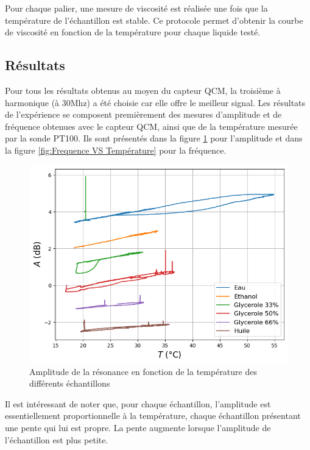 Pour chaque palier, une mesure de viscosité est réalisée une fois que la température de l'échantillon est stable. Ce protocole permet d'obtenir la courbe de viscosité en fonction de la température pour chaque liquide testé.
\newpage
\subsection{Résultats}

Pour tous les résultats obtenus au moyen du capteur QCM, la troisième à harmonique (à 30Mhz) a été choisie car elle offre le meilleur signal. Les résultats de l'expérience se composent premièrement des mesures d'amplitude et de fréquence obtenues avec le capteur QCM, ainsi que de la température mesurée par la sonde PT100.  
Ils sont présentés dans la figure \ref{fig:Amplitude VS Température} pour l'amplitude et dans la figure \ref{fig:Frequence VS Température} pour la fréquence.

\begin{figure}[H]
    \centering
    \includegraphics[width=\textwidth]{assets/figures/Amplitude-Temperature.png}
    \caption{Amplitude de la résonance en fonction de la température des différents échantillons}
    \label{fig:Amplitude VS Température}
\end{figure}

Il est intéressant de noter que, pour chaque échantillon, l'amplitude est essentiellement proportionnelle à la température, chaque échantillon présentant une pente qui lui est propre.  
La pente augmente lorsque l'amplitude de l'échantillon est plus petite.

